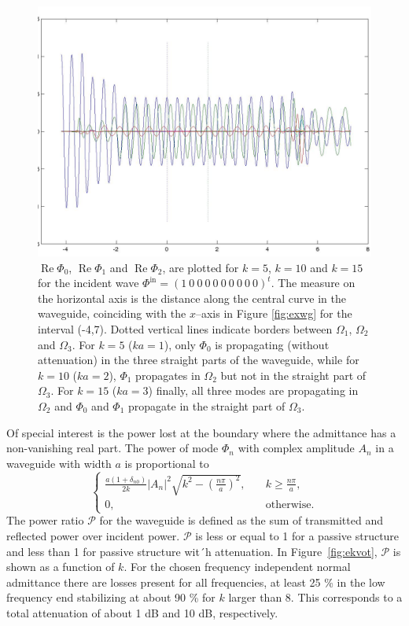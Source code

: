 \documentclass{svjour3}
\providecommand{\abs}[1]{\left\lvert#1\right\rvert}
\renewcommand{\Phi}{\varPhi}
\renewcommand{\Re}{\operatorname{Re}}
\renewcommand{\vec}[1]{\bm{#1}}
\renewcommand{\Phi}{\varPhi}
\newcommand{\Phiin}{\vec\Phi^{\text{in}}}
\begin{document}
\begin{figure}[t]
  \includegraphics[width=\linewidth]{phin3a}
  \caption{$\Re\Phi_0$, $\Re\Phi_1$ and $\Re\Phi_2$, are plotted for
    $k=5$, $k=10$ and $k=15$ for the incident wave $\Phiin=(1\ 0\ 0\
    0\ 0\ 0\ 0\ 0\ 0\ 0)^t$. The measure on the horizontal axis is the
    distance along the central curve in the waveguide, coinciding with
    the $x$--axis in Figure \ref{fig:exwg} for the interval
    (-4,7). Dotted vertical lines indicate borders between $\Omega_1$,
    $\Omega_2$ and $\Omega_3$. For $k=5$ ($ka=1$), only $\Phi_0$ is
    propagating (without attenuation) in the three straight parts of
    the waveguide, while for $k=10$ ($ka=2$), $\Phi_1$ propagates in
    $\Omega_2$ but not in the straight part of $\Omega_3$. For $k=15$
    ($ka=3$) finally, all three modes are propagating in $\Omega_2$
    and $\Phi_0$ and $\Phi_1$ propagate in the straight part of
    $\Omega_3$.}
  \label{fig:phi}
\end{figure}

Of special interest is the power lost at the boundary where the
admittance has a non-vanishing real part. The power of mode $\Phi_n$
with complex amplitude $A_n$ in a waveguide with width $a$ is
proportional to
\begin{equation}\label{eq:power}
  \begin{cases}
    \frac{a(1+\delta_{n0})}{2k}\abs{A_n}^2
    \sqrt{k^2-\left(\frac{n\pi}a\right)^2},\quad&
    k\ge\frac{n\pi}a,\\
    0,&\text{otherwise}.
  \end{cases}
\end{equation}
The power ratio $\mathcal P$ for the waveguide is defined as the sum
of transmitted and reflected power over incident power. $\mathcal P$
is less or equal to 1 for a passive structure and less than 1 for
passive structure wit´h attenuation. In Figure~\ref{fig:ekvot},
$\mathcal P$ is shown as a function of $k$. For the chosen frequency
independent normal admittance there are losses present for all
frequencies, at least 25 \% in the low frequency end stabilizing at
about 90 \% for $k$ larger than 8. This corresponds to a total
attenuation of about 1 dB and 10 dB, respectively.
\end{document}
